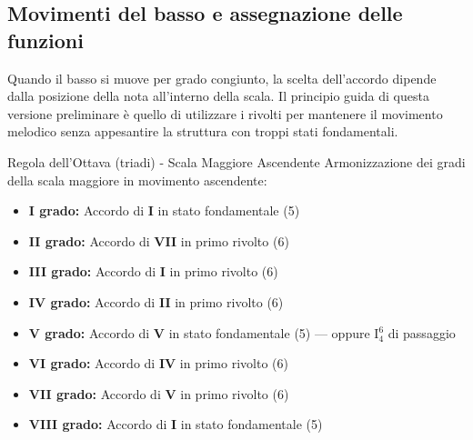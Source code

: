 \subsection{Movimenti del basso e assegnazione delle funzioni}
\label{subsec:principio_regola_ottava}

Quando il basso si muove per grado congiunto, la scelta dell'accordo dipende dalla posizione della nota all'interno della scala. Il principio guida di questa versione preliminare è quello di utilizzare i rivolti per mantenere il movimento melodico senza appesantire la struttura con troppi stati fondamentali.

\begin{regola}{Regola dell'Ottava (triadi) - Scala Maggiore Ascendente}
	\label{reg:regola_ottava_maggiore_asc}
	Armonizzazione dei gradi della scala maggiore in movimento ascendente:
	
	\begin{itemize}
		\item \textbf{I grado:} Accordo di \textbf{I} in stato fondamentale (5)
		\item \textbf{II grado:} Accordo di \textbf{VII} in primo rivolto (6)
		\item \textbf{III grado:} Accordo di \textbf{I} in primo rivolto (6)
		\item \textbf{IV grado:} Accordo di \textbf{II} in primo rivolto (6)
		\item \textbf{V grado:} Accordo di \textbf{V} in stato fondamentale (5) — oppure I$^6_4$ di passaggio
		\item \textbf{VI grado:} Accordo di \textbf{IV} in primo rivolto (6)
		\item \textbf{VII grado:} Accordo di \textbf{V} in primo rivolto (6)
		\item \textbf{VIII grado:} Accordo di \textbf{I} in stato fondamentale (5)
	\end{itemize}
\end{regola}



